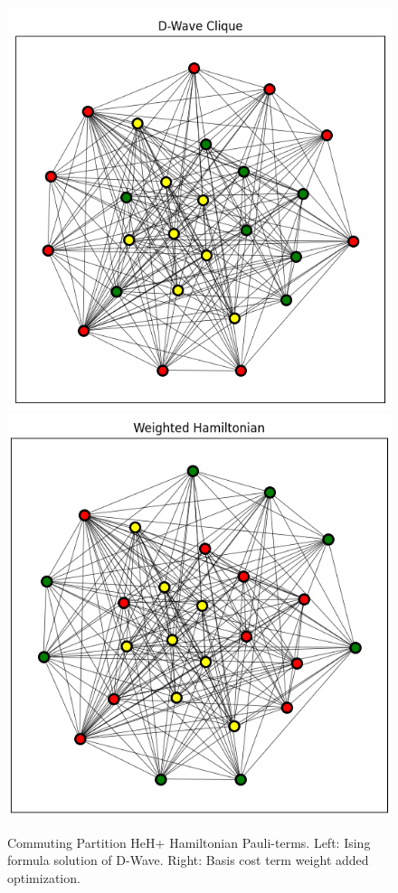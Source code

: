 \documentclass[
11pt,notheorems,hyperref={pdfauthor=Hyunseong Kim}
]{beamer}
\begin{document}
\begin{frame}
    \begin{figure}
        \includegraphics[scale=0.5]{clique.png}
        \includegraphics[scale=0.5]{clique_w.png}
        \caption{Commuting Partition HeH+ Hamiltonian Pauli-terms. Left: Ising formula solution of D-Wave. Right: Basis cost term weight added optimization.}       
    \end{figure}
\end{frame}
\end{document}
